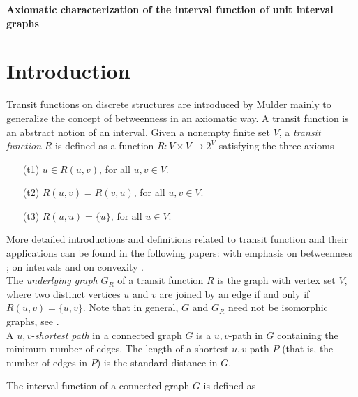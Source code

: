 \documentclass[10pt,a4paper]{article}
\begin{document}
	
\linenumbers
	
\begin{center}

{\textbf{Axiomatic characterization of the interval function of unit interval graphs}}
\end{center}

\section{Introduction} 

Transit functions on discrete structures are
introduced by Mulder \cite{muld-08} mainly to generalize the concept
of betweenness in an axiomatic way. A transit function is an abstract notion of an interval. Given a nonempty finite set $V$, a \emph{transit function} $R$ is defined as a function $R:V\times V\to 2^V$ satisfying the three axioms 

\begin{itemize} \item [(t1)] $u\in R(u,v)$, for all $u,v\in V$.
		\item [(t2)] $R(u,v)=R(v,u)$, for all $u,v\in V$. \item [(t3)]
			$R(u,u)=\{u\}$, for all $u\in V$.  \end{itemize}

More detailed introductions and definitions related to transit function and their applications can be found in the following papers:
with emphasis on betweenness \cite{Changat-20, mcjmhm-10, Changat-22,
momu-02, mu-80}; on intervals \cite{kaMc-01, chklmu-01, mcjmhm-10,
mu-80, mune-09, nebe-94, ne-08, nebe-01, nebe-02} and on convexity
\cite{chklmu-01, mchmgs-05, duch-88, momu-02, mu-80}.\\  



The \emph{underlying graph} $G_{R}$ of a transit function $R$ is the graph with vertex set $V$, where two distinct vertices $u$ and $v$ are joined by an edge if and only if $R(u, v) =\{u,v\}$. Note that in general, $G$ and $G_{R}$ need not be isomorphic graphs, see \cite{muld-08}.\\

A $u,v$-\emph{shortest path} in a connected graph $G$ is a $u,v$-path in $G$ containing the minimum number of edges. The length of a shortest $u,v$-path $P$ (that is, the number of edges in $P$) is the standard distance in $G$. 
 
\noindent The interval function of a connected graph $G$ is defined as
\end{document}
